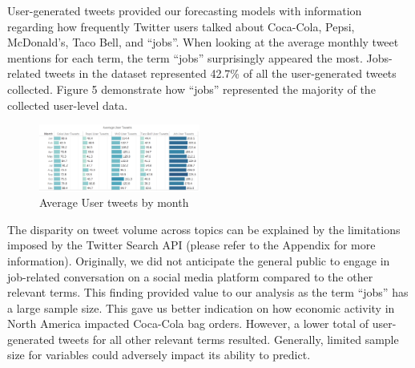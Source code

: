 \documentclass[12pt,oneside]{chicagocapstone}
\begin{document}
User-generated tweets provided our forecasting models with information regarding how frequently Twitter users talked about Coca-Cola, Pepsi, McDonald's, Taco Bell, and ``jobs''. When looking at the average monthly tweet mentions for each term, the term ``jobs'' surprisingly appeared the most. Jobs-related tweets in the dataset represented 42.7\% of all the user-generated tweets collected. Figure 5 demonstrate how ``jobs'' represented the majority of the collected user-level data.
\begin{figure}

{\centering \includegraphics[width=200px,angle = 0, scale=2.1]{figure/AveUserTweets} 

}

\caption{Average User tweets by month}\label{fig:AveUserTweet}
\end{figure}
The disparity on tweet volume across topics can be explained by the limitations imposed by the Twitter Search API (please refer to the Appendix for more information). Originally, we did not anticipate the general public to engage in job-related conversation on a social media platform compared to the other relevant terms. This finding provided value to our analysis as the term ``jobs'' has a large sample size. This gave us better indication on how economic activity in North America impacted Coca-Cola bag orders. However, a lower total of user-generated tweets for all other relevant terms resulted. Generally, limited sample size for variables could adversely impact its ability to predict.
\end{document}
